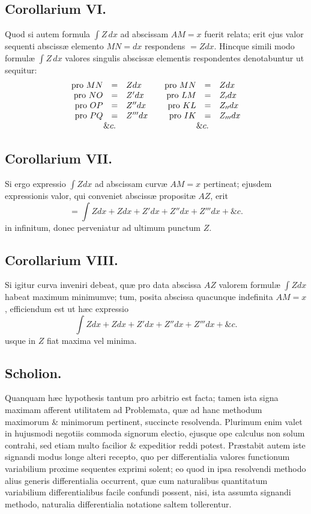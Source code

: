\subsection*{Corollarium VI.}
Quod si autem formula $\int Z\,dx$ ad abscissam $AM=x$ fuerit relata; erit ejus valor sequenti abscissæ elemento $MN=dx$ respondens $=Zdx$. Hincque simili modo formulæ $\int Z\,dx$ valores singulis abscissæ elementis respondentes denotabuntur ut sequitur:
\[
\begin{array}{rclcrcl}
\text{pro }MN&=&Zdx&&\text{pro }MN&=&Zdx\\
\text{pro }NO&=&Z'dx&&\text{pro }LM&=&Z_{\prime}dx\\
\text{pro }OP&=&Z''dx&&\text{pro }KL&=&Z_{\prime\prime}dx\\
\text{pro }PQ&=&Z'''dx&&\text{pro }IK&=&Z_{\prime\prime\prime}dx\\
\multicolumn{3}{c}{\&c.}&&\multicolumn{3}{c}{\&c.}
\end{array}
\]


\subsection*{Corollarium VII.}
Si ergo expressio $\int Zdx$ ad abscissam curvæ $AM=x$ pertineat; ejusdem expressionis valor, qui conveniet abscissæ propositæ $AZ$, erit
\[
=\int Zdx+Zdx+Z'dx+Z''dx+Z'''dx+\&c.
\]
in infinitum, donec perveniatur ad ultimum punctum $Z$.

\subsection*{Corollarium VIII.}
Si igitur curva inveniri debeat, quæ pro data abscissa $AZ$ valorem formulæ $\int Zdx$ habeat maximum minimumve; tum, posita abscissa quacunque indefinita $AM=x$, efficiendum est ut hæc expressio
\[
\int Zdx+Zdx+Z'dx+Z''dx+Z'''dx+\&c.
\]
usque in $Z$ fiat maxima vel minima.

\subsection*{Scholion.}
Quanquam hæc hypothesis tantum pro arbitrio est facta; tamen ista signa maximam afferent utilitatem ad Problemata, quæ ad hanc methodum maximorum \& minimorum pertinent, succincte resolvenda. Plurimum enim valet in hujusmodi negotiis commoda signorum electio, ejusque ope calculus non solum contrahi, sed etiam multo facilior \& expeditior reddi potest. Præstabit autem iste signandi modus longe alteri recepto, quo per differentialia valores functionum variabilium proxime sequentes exprimi solent; eo quod in ipsa resolvendi methodo alius generis differentialia occurrent, quæ cum naturalibus quantitatum variabilium differentialibus facile confundi possent, nisi, ista assumta signandi methodo, naturalia differentialia notatione saltem tollerentur.

